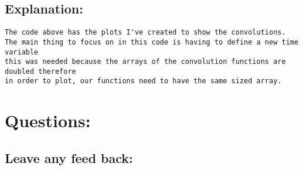 \documentclass{article}
\begin{document}
\subsection{Explanation:}

\begin{verbatim}
The code above has the plots I've created to show the convolutions. 
The main thing to focus on in this code is having to define a new time variable 
this was needed because the arrays of the convolution functions are doubled therefore 
in order to plot, our functions need to have the same sized array.
\end{verbatim}

\pagebreak

\maketitle

\section{Questions:}

\subsection{Leave any feed back:}

\begin{verbatim}

\end{verbatim}
\end{document}
